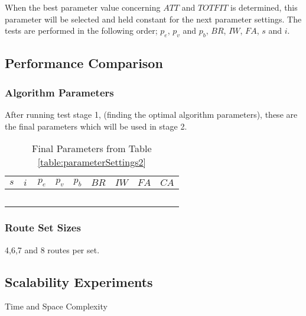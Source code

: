 When the best parameter value concerning $ATT$ and $TOTFIT$ is determined, this parameter will be selected and held constant for the next parameter settings. The tests are performed in the following order; $p_{e}$, $p_{v}$ and $p_{b}$, $BR$, $IW$, $FA$, $s$ and $i$.

\subsection{Performance Comparison}

\subsubsection{Algorithm Parameters}
After running test stage 1, (finding the optimal algorithm parameters), these are the final parameters which will be used in stage 2.

\begin{table}[H]
	\centering
    \begin{tabular}{|l|l|l|l|l|l|l|l|l|}
 	\hline
 	$s$ & $i$ & $p_{e}$ & $p_{v}$ & $p_{b}$ & $BR$  & $IW$ & $FA$ & $CA$  \\
 	\hline
    ~ & ~ & ~ & ~ & ~ & ~ & ~ & ~  & ~  \\
	\hline
    \end{tabular}
    \caption {Final Parameters from Table \ref{table:parameterSettings2}}
    \label{table:finalParameters}
	\end{table}

\subsubsection{Route Set Sizes}
4,6,7 and 8 routes per set.

\subsection{Scalability Experiments}
Time and Space Complexity
